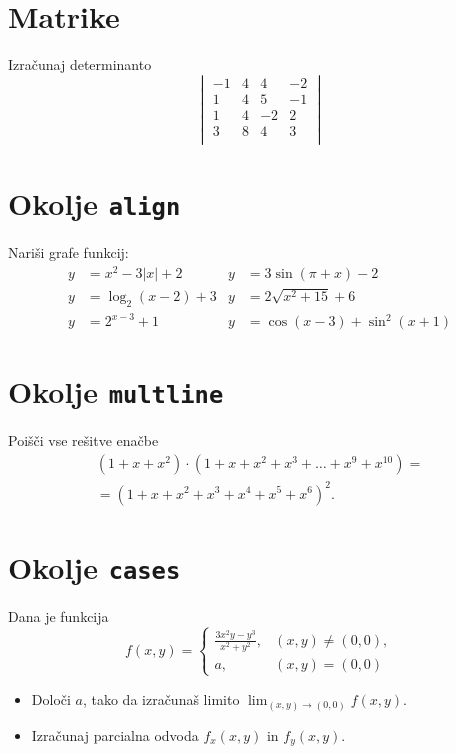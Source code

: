 \documentclass[a4paper,12pt]{article}
\begin{document}
\section*{Matrike}
Izračunaj determinanto
\[
\begin{vmatrix}
   -1 & 4 & 4 & -2 \\
    1 & 4 & 5 & -1 \\
    1 & 4 & -2 & 2 \\
    3 & 8 & 4 & 3 \\
\end{vmatrix}
\]


\section*{Okolje \texttt{align}}
Nariši grafe funkcij:
\begin{align*}
   y &= x^2 - 3|x| + 2    
    & y &= 3 \sin(\pi+x) - 2 \\
   y &= \log_2(x-2) + 3   
    & y &= 2 \sqrt{x^2+15} + 6 \\
   y &= 2^{x-3} + 1      
    & y &= \cos(x-3) + \sin^2(x+1)
\end{align*}



\section*{Okolje \texttt{multline}}
Poišči vse rešitve enačbe
\begin{multline*}
   (1+x+x^2) \cdot (1+x+x^2+x^3+\ldots+x^9+x^{10}) =\\
= (1+x+x^2+x^3+x^4+x^5+x^6)^2.
\end{multline*}



\section*{Okolje \texttt{cases}}
Dana je funkcija
\[
f(x,y)=
\begin{cases}
   \frac{3x^2y-y^3}{x^2+y^2}, & (x,y)\ne(0,0),\\
   a, & (x,y)=(0,0)
\end{cases}
\]

\begin{itemize}
\item Določi \(a\), tako da izračunaš limito \( \lim_{(x,y)\to(0,0)} f(x,y) \).
\item Izračunaj parcialna odvoda \(f_x(x,y)\) in \(f_y(x,y)\).
\end{itemize}
\end{document}
